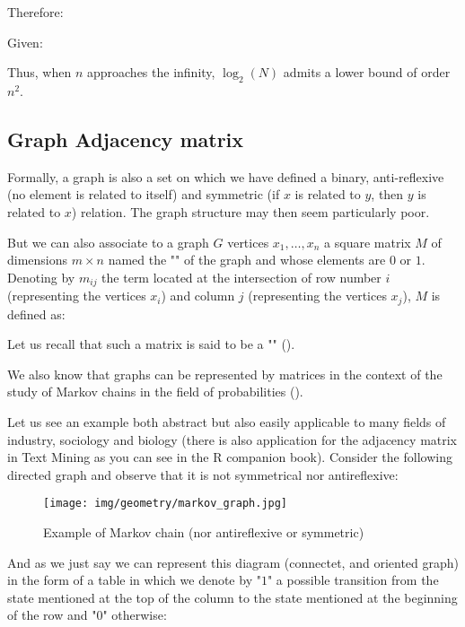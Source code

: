 {\begin{enumerate}
		Therefore:
		
		Given:
		
		Thus, when $n$ approaches the infinity, $\log_2(N)$ admits a lower bound of order $n^2$.
	\end{enumerate}
	
	\pagebreak
	\subsection{Graph Adjacency matrix}
	Formally, a graph is also a set on which we have defined a binary, anti-reflexive (no element is related to itself) and symmetric (if $x$ is related to $y$, then $y$ is related to $x$) relation. The graph structure may then seem particularly poor.
	
	But we can also associate to a graph $G$ vertices $x_1,\ldots, x_n$ a square matrix $M$ of dimensions $m\times n$ named the "" of the graph and whose elements are $0$ or $1$. Denoting by $m_{ij}$ the term located at the intersection of row number $i$ (representing the vertices $x_i$) and column $j$ (representing the vertices $x_j$), $M$ is defined as:
	
	Let us recall that such a matrix is said to be a "" ().
	\begin{tcolorbox}[title=Remark,colframe=black,arc=10pt]
	We also know that graphs can be represented by matrices in the context of the study of Markov chains in the field of probabilities ().
	\end{tcolorbox}
	Let us see an example both abstract but also easily applicable to many fields of industry, sociology and biology (there is also application for the adjacency matrix in Text Mining as you can see in the R companion book). Consider the following directed graph and observe that it is not symmetrical nor antireflexive:
	\begin{figure}[H]
		\centering
		\texttt{[image: img/geometry/markov\_graph.jpg]}
		\caption{Example of Markov chain (nor antireflexive or symmetric)}
	\end{figure}
	And as we just say we can represent this diagram (connectet, and oriented graph) in the form of a table in which we denote by "$1$" a possible transition from  the state mentioned at the top of the column to the state mentioned at the beginning of the row and "$0$" otherwise:
	
}
